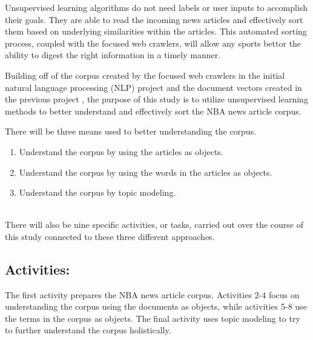 \documentclass[5p,authoryear]{elsarticle}
\begin{document}
Unsupervised learning algorithms do not need labels or user inputs to accomplish their goals.
They are able to read the incoming news articles and effectively sort them based on underlying similarities within the articles.
This automated sorting process, coupled with the focused web crawlers, will allow any sports bettor the ability to digest the right information in a timely manner. 

Building off of the corpus created by the focused web crawlers in the initial natural language processing (NLP) project \citep{project1} and the document vectors created in the previous project \citep{project2}, the purpose of this study is to utilize unsupervised learning methods to better understand and effectively sort the NBA news article corpus. 

There will be three means used to better understanding the corpus.

\begin{enumerate}
 \item Understand the corpus by using the articles as objects.
 \item Understand the corpus by using the words in the articles as objects.
 \item Understand the corpus by topic modeling. 
\end{enumerate} \\

There will also be nine specific activities, or tasks, carried out over the course of this study connected to these three different approaches. 


\subsection{Activities:}\label{activity}

The first activity prepares the NBA news article corpus. 
Activities 2-4 focus on understanding the corpus using the documents as objects, while activities 5-8 use the terms in the corpus as objects. 
The final activity uses topic modeling to try to further understand the corpus holistically.
\end{document}
